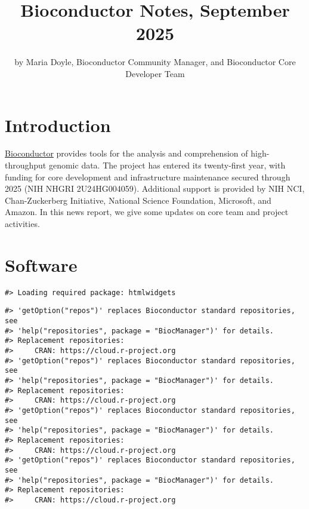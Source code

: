 \title{Bioconductor Notes, September 2025}


\author{by Maria Doyle, Bioconductor Community Manager, and Bioconductor Core Developer Team}

\maketitle


\section{Introduction}\label{introduction}

\href{https://bioconductor.org}{Bioconductor} provides
tools for the analysis and comprehension of high-throughput genomic
data. The project has entered its twenty-first year, with funding
for core development and infrastructure maintenance secured
through 2025 (NIH NHGRI 2U24HG004059). Additional support is provided
by NIH NCI, Chan-Zuckerberg Initiative, National Science Foundation,
Microsoft, and Amazon. In this news report, we give some updates on
core team and project activities.

\section{Software}\label{software}

\begin{verbatim}
#> Loading required package: htmlwidgets
\end{verbatim}

\begin{verbatim}
#> 'getOption("repos")' replaces Bioconductor standard repositories, see
#> 'help("repositories", package = "BiocManager")' for details.
#> Replacement repositories:
#>     CRAN: https://cloud.r-project.org
#> 'getOption("repos")' replaces Bioconductor standard repositories, see
#> 'help("repositories", package = "BiocManager")' for details.
#> Replacement repositories:
#>     CRAN: https://cloud.r-project.org
#> 'getOption("repos")' replaces Bioconductor standard repositories, see
#> 'help("repositories", package = "BiocManager")' for details.
#> Replacement repositories:
#>     CRAN: https://cloud.r-project.org
#> 'getOption("repos")' replaces Bioconductor standard repositories, see
#> 'help("repositories", package = "BiocManager")' for details.
#> Replacement repositories:
#>     CRAN: https://cloud.r-project.org
\end{verbatim}

